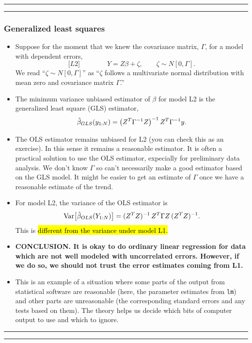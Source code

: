 \documentclass[]{article}
\begin{document}
\begin{center}\rule{0.5\linewidth}{\linethickness}\end{center}

\begin{center}\rule{0.5\linewidth}{\linethickness}\end{center}

\subsubsection{Generalized least
squares}\label{generalized-least-squares}

\begin{itemize}
\item
  Suppose for the moment that we knew the covariance matrix, \(\Gamma\),
  for a model with dependent errors, $${[}L2{]}
  \quad\quad\quad\quad Y = Z\beta + \zeta, \quad \quad \zeta \sim N[0,\Gamma].$$
  We read ``\(\zeta \sim N[0,\Gamma]\)'' as ``\(\zeta\) follows a
  multivariate normal distribution with mean zero and covariance matrix
  \(\Gamma\).''
\item
  The minimum variance unbiased estimator of \(\beta\) for model L2 is
  the generalized least square (GLS) estimator,
  \[\hat \beta_{GLS}(y_{1:N}) = \big( Z^{\scriptsize{T}} \Gamma^{-1} Z \big)^{-1} \, Z^{\scriptsize{T}} \Gamma^{-1} y.\]
\item
  The OLS estimator remains unbiased for L2 (you can check this as an
  exercise). In this sense it remains a reasonable estimator. It is
  often a practical solution to use the OLS estimator, expecially for
  preliminary data analysis. We don't know \(\Gamma\) so can't
  necessarily make a good estimator based on the GLS model. It might be
  easier to get an estimate of \(\Gamma\) once we have a reasonable
  estimate of the trend.
\item
  For model L2, the variance of the OLS estimator is
  \[\mathrm{Var}\big[\hat \beta_{OLS}(Y_{1:N})\big] = (Z^{\scriptsize{T}} Z)^{-1} \, Z^{\scriptsize{T}} \Gamma Z\, (Z^{\scriptsize{T}} Z)^{-1}.\]
  This is \hl{different from the variance under model L1.}
\item
  \textbf{CONCLUSION. It is okay to do ordinary linear regression for
  data which are not well modeled with uncorrelated errors. However, if
  we do so, we should not trust the error estimates coming from L1.}
\item
  This is an example of a situation where some parts of the output from
  statistical software are reasonable (here, the parameter estimates
  from \texttt{lm}) and other parts are unreasonable (the corresponding
  standard errors and any tests based on them). The theory helps us
  decide which bits of computer output to use and which to ignore.
\end{itemize}

\begin{center}\rule{0.5\linewidth}{\linethickness}\end{center}

\begin{center}\rule{0.5\linewidth}{\linethickness}\end{center}
\end{document}

